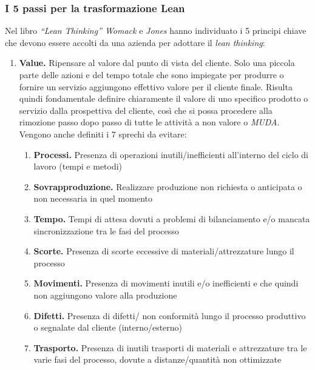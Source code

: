 \subsubsection{I 5 passi per la trasformazione Lean}
Nel libro \textit{“Lean Thinking” Womack} e \textit{Jones} hanno individuato i 5 principi chiave che devono essere accolti da una azienda per adottare il \textit{lean thinking}:
\begin{enumerate}
	\item \textbf{Value.} Ripensare al valore dal punto di vista del cliente. Solo una piccola parte delle azioni e del tempo totale che sono impiegate per produrre o fornire un servizio aggiungono effettivo valore per il cliente finale. Risulta quindi fondamentale definire chiaramente il valore di uno specifico prodotto o servizio dalla prospettiva del cliente, così che si possa procedere alla rimozione passo dopo passo di tutte le attività a non valore o \textit{MUDA}. Vengono anche definiti i 7 sprechi da evitare:
		\begin{enumerate}[label=\arabic*.]
			\item \textbf{Processi.} Presenza di operazioni inutili/inefficienti all’interno del ciclo di lavoro (tempi e metodi)
			\item \textbf{Sovrapproduzione.} Realizzare produzione non richiesta o anticipata o non necessaria in quel momento
			\item \textbf{Tempo.} Tempi di attesa dovuti a problemi di bilanciamento e/o mancata sincronizzazione tra le fasi del processo
			\item \textbf{Scorte.} Presenza di scorte eccessive di materiali/attrezzature lungo il processo
			\item \textbf{Movimenti.} Presenza di movimenti inutili e/o inefficienti e che quindi non aggiungono valore alla produzione
			\item \textbf{Difetti.} Presenza di difetti/ non conformità lungo il processo produttivo o segnalate dal cliente (interno/esterno)
			\item \textbf{Trasporto.} Presenza di inutili trasporti di materiali e attrezzature tra le varie fasi del processo, dovute a distanze/quantità
				non ottimizzate
		\end{enumerate}
		

\end{enumerate}
